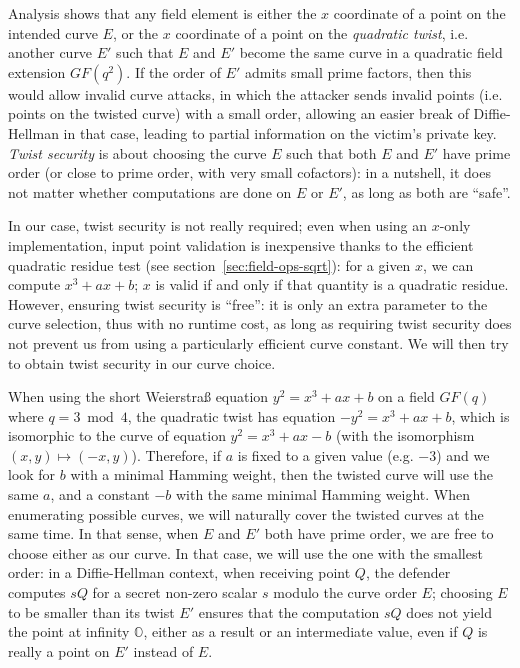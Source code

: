 \documentclass{llncs}
\newcommand{\GF}{GF}
\newcommand{\neutral}{\mathbb{O}}
\begin{document}
Analysis shows that any field element is either the $x$ coordinate of a
point on the intended curve $E$, or the $x$ coordinate of a point on the
\emph{quadratic twist}, i.e. another curve $E'$ such that $E$ and $E'$
become the same curve in a quadratic field extension $\GF(q^2)$. If the
order of $E'$ admits small prime factors, then this would allow invalid
curve attacks\cite{BieMeyMul2000}, in which the attacker sends invalid
points (i.e. points on the twisted curve) with a small order, allowing
an easier break of Diffie-Hellman in that case, leading to partial
information on the victim's private key. \emph{Twist security} is about
choosing the curve $E$ such that both $E$ and $E'$ have prime order (or
close to prime order, with very small cofactors): in a nutshell, it does
not matter whether computations are done on $E$ or $E'$, as long as both
are ``safe''.

In our case, twist security is not really required; even when using an
$x$-only implementation, input point validation is inexpensive thanks to
the efficient quadratic residue test (see
section~\ref{sec:field-ops-sqrt}): for a given $x$, we can compute
$x^3+ax+b$; $x$ is valid if and only if that quantity is a quadratic
residue. However, ensuring twist security is ``free'': it is only an
extra parameter to the curve selection, thus with no runtime cost, as
long as requiring twist security does not prevent us from using a
particularly efficient curve constant. We will then try to obtain twist
security in our curve choice.

When using the short Weierstraß equation $y^2 = x^3+ax+b$ on a field
$\GF(q)$ where $q = 3 \bmod 4$, the quadratic twist has equation $-y^2 =
x^3+ax+b$, which is isomorphic to the curve of equation $y^2 = x^3+ax-b$
(with the isomorphism $(x,y) \mapsto (-x,y)$). Therefore, if $a$ is
fixed to a given value (e.g. $-3$) and we look for $b$ with a minimal
Hamming weight, then the twisted curve will use the same $a$, and a
constant $-b$ with the same minimal Hamming weight. When enumerating
possible curves, we will naturally cover the twisted curves at the same
time. In that sense, when $E$ and $E'$ both have prime order, we are
free to choose either as our curve. In that case, we will use the one
with the smallest order: in a Diffie-Hellman context, when receiving
point $Q$, the defender computes $sQ$ for a secret non-zero scalar $s$
modulo the curve order $E$; choosing $E$ to be smaller than its twist
$E'$ ensures that the computation $sQ$ does not yield the point at
infinity $\neutral$, either as a result or an intermediate value, even
if $Q$ is really a point on $E'$ instead of $E$.
\end{document}
